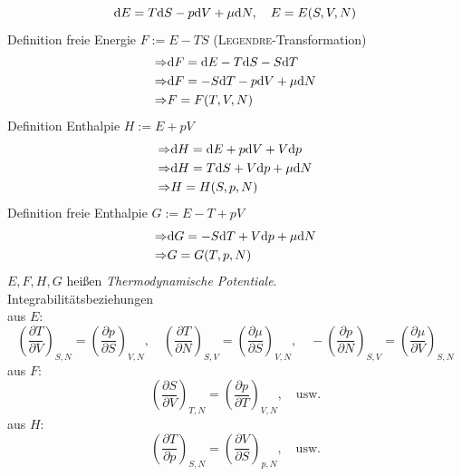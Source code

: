 \begin{equation}
  \mathrm{d} E = T \mathrm{d} S - p \mathrm{d} V + \mu \mathrm{d} N, \quad E=E(S, V, N)
\end{equation}
Definition freie Energie $F:=E - TS$ (\textsc{Legendre}-Transformation)
\begin{equation}
\begin{split}
  \Rightarrow & \mathrm{d} F = \mathrm{d} E - T \mathrm{d} S - S \mathrm{d} T \\
  \Rightarrow & \mathrm{d} F = -S\mathrm{d} T - p \mathrm{d} V + \mu \mathrm{d} N \\
  \Rightarrow & F=F(T, V, N)
\end{split}
\end{equation}
Definition Enthalpie $H:=E+pV$
\begin{equation}
\begin{split}
  \Rightarrow & \mathrm{d} H = \mathrm{d} E + p \mathrm{d} V + V \mathrm{d} p \\
  \Rightarrow & \mathrm{d} H = T \mathrm{d} S + V \mathrm{d} p + \mu \mathrm{d} N \\
  \Rightarrow & H=H(S, p, N)
\end{split}
\end{equation}
Definition freie Enthalpie $G:=E-T+pV$
\begin{equation}
\begin{split}
  \Rightarrow & \mathrm{d} G = - S \mathrm{d} T + V \mathrm{d} p + \mu \mathrm{d} N \\
  \Rightarrow & G=G(T, p, N)
\end{split}
\end{equation}
$E, F, H, G$ heißen \emph{Thermodynamische Potentiale}. \\
Integrabilitätsbeziehungen\\
aus $E$:
\begin{equation}
  \left( \frac{\partial T}{\partial V} \right)_{S, N} = \left( \frac{\partial p}{\partial S} \right)_{V, N}, \quad
  \left( \frac{\partial T}{\partial N} \right)_{S, V} = \left( \frac{\partial \mu}{\partial S} \right)_{V, N}, \quad
  - \left( \frac{\partial p}{\partial N} \right)_{S, V} = \left( \frac{\partial \mu}{\partial V} \right)_{S, N}
\end{equation}
aus $F$:
\begin{equation}
  \left( \frac{\partial S}{\partial V} \right)_{T, N} = \left( \frac{\partial p}{\partial T} \right)_{V, N}, \quad \text{usw.}
\end{equation}
aus $H$:
\begin{equation}
  \left( \frac{\partial T}{\partial p} \right)_{S, N} = \left( \frac{\partial V}{\partial S} \right)_{p, N}, \quad \text{usw.}
\end{equation}
